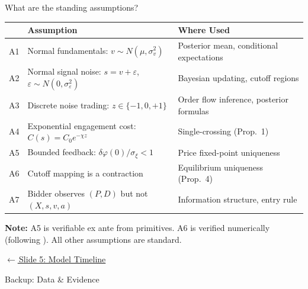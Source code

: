 \documentclass[aspectratio=169,10pt]{beamer}
\newcommand{\1}{\mathbf{1}}
\newcommand{\returnlink}[2]{%
  \par\vspace{0.2em}\hfill{\scriptsize\hyperlink{#1}{\textcolor{brightblue}{$\leftarrow$\,#2}}}%
}
\begin{document}
\begin{frame}{What are the standing assumptions?}
\hypertarget{backup:assumptions}{}
\footnotesize
\begin{center}
\begin{tabular}{clp{6.5cm}}
\toprule
& \textbf{Assumption} & \textbf{Where Used} \\
\midrule
A1 & Normal fundamentals: $v \sim N(\mu, \sigma_v^2)$ & Posterior mean, conditional expectations \\
A2 & Normal signal noise: $s = v + \varepsilon$, $\varepsilon \sim N(0, \sigma_\varepsilon^2)$ & Bayesian updating, cutoff regions \\
A3 & Discrete noise trading: $z \in \{-1,0,+1\}$ & Order flow inference, posterior formulas \\
A4 & Exponential engagement cost: $C(s) = C_0 e^{-\chi z}$ & Single-crossing (Prop.\ 1) \\
A5 & Bounded feedback: $\delta\varphi(0)/\sigma_\xi < 1$ & Price fixed-point uniqueness \\
A6 & Cutoff mapping is a contraction & Equilibrium uniqueness (Prop.\ 4) \\
A7 & Bidder observes $(P, D)$ but not $(X, s, v, a)$ & Information structure, entry rule \\
\bottomrule
\end{tabular}
\end{center}

\vspace{0.3em}

\textbf{Note:} A5 is verifiable ex ante from primitives. A6 is verified numerically (following \citealp{EdmansGoldsteinJiang2015}). All other assumptions are standard.

\returnlink{main:timeline}{Slide 5: Model Timeline}
\end{frame}

\begin{frame}[standout]
Backup: Data \& Evidence
\end{frame}
\end{document}
